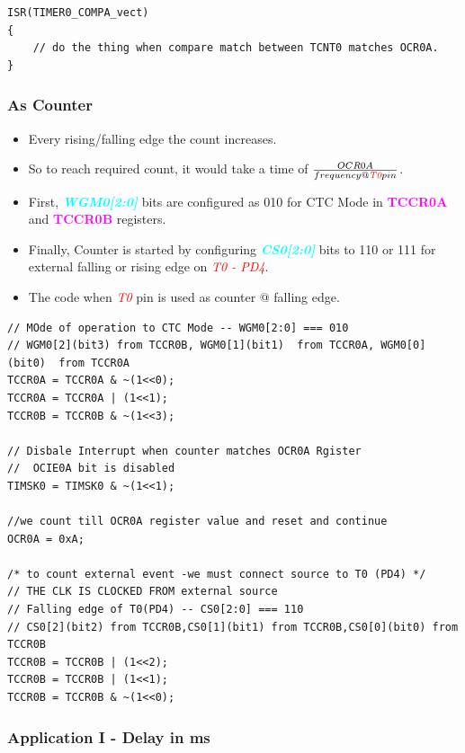 \documentclass{article}
\newcommand{\bitFormat}[1]{\emph{\textbf{\textcolor{cyan}{#1}}}}
\newcommand{\regFormat}[1]{\textbf{\textcolor{magenta}{#1}}}
\newcommand{\pinFormat}[1]{\emph{\textcolor{red}{#1}}}
\begin{document}
\begin{verbatim}
ISR(TIMER0_COMPA_vect)
{
    // do the thing when compare match between TCNT0 matches OCR0A.
}
\end{verbatim}


\subsubsection{As Counter}
\begin{itemize}
    \item Every rising/falling edge the count increases.
    \item So to reach required count, it would take a time of $\frac{OCR0A}{frequency @ \pinFormat{T0} pin}$.
    \item First, \bitFormat{WGM0[2:0]} bits are configured as 010 for CTC Mode in \regFormat{TCCR0A} and \regFormat{TCCR0B} registers.
    \item Finally, Counter is started by configuring \bitFormat{CS0[2:0]} bits to 110 or 111 for external falling or rising edge on \pinFormat{T0 - PD4}.
    \item The code when \pinFormat{T0} pin is used as counter @ falling edge.
\end{itemize}

\begin{verbatim}
// MOde of operation to CTC Mode -- WGM0[2:0] === 010
// WGM0[2](bit3) from TCCR0B, WGM0[1](bit1)  from TCCR0A, WGM0[0](bit0)  from TCCR0A
TCCR0A = TCCR0A & ~(1<<0);
TCCR0A = TCCR0A | (1<<1);
TCCR0B = TCCR0B & ~(1<<3);
    
// Disbale Interrupt when counter matches OCR0A Rgister
//  OCIE0A bit is disabled
TIMSK0 = TIMSK0 & ~(1<<1);

//we count till OCR0A register value and reset and continue 
OCR0A = 0xA;

/* to count external event -we must connect source to T0 (PD4) */
// THE CLK IS CLOCKED FROM external source
// Falling edge of T0(PD4) -- CS0[2:0] === 110
// CS0[2](bit2) from TCCR0B,CS0[1](bit1) from TCCR0B,CS0[0](bit0) from TCCR0B
TCCR0B = TCCR0B | (1<<2);
TCCR0B = TCCR0B | (1<<1);
TCCR0B = TCCR0B & ~(1<<0);
\end{verbatim}

\subsubsection{Application I - Delay in ms}
\end{document}
